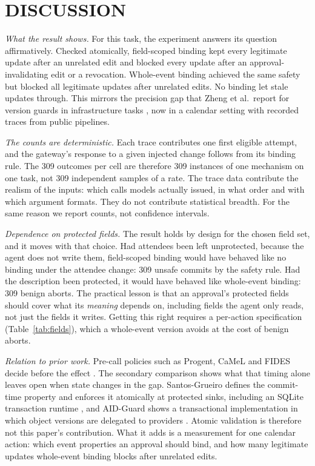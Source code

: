 \section{DISCUSSION}
\label{sec:discussion}
\textit{What the result shows.} For this task, the experiment answers its question affirmatively. Checked atomically, field-scoped binding kept every legitimate update after an unrelated edit and blocked every update after an approval-invalidating edit or a revocation. Whole-event binding achieved the same safety but blocked all legitimate updates after unrelated edits. No binding let stale updates through. This mirrors the precision gap that Zheng et al.\ report for version guards in infrastructure tasks \cite{zheng2026stale}, now in a calendar setting with recorded traces from public pipelines.

\textit{The counts are deterministic.} Each trace contributes one first eligible attempt, and the gateway's response to a given injected change follows from its binding rule. The 309 outcomes per cell are therefore 309 instances of one mechanism on one task, not 309 independent samples of a rate. The trace data contribute the realism of the inputs: which calls models actually issued, in what order and with which argument formats. They do not contribute statistical breadth. For the same reason we report counts, not confidence intervals.

\textit{Dependence on protected fields.} The result holds by design for the chosen field set, and it moves with that choice. Had attendees been left unprotected, because the agent does not write them, field-scoped binding would have behaved like no binding under the attendee change: 309 unsafe commits by the safety rule. Had the description been protected, it would have behaved like whole-event binding: 309 benign aborts. The practical lesson is that an approval's protected fields should cover what its \emph{meaning} depends on, including fields the agent only reads, not just the fields it writes. Getting this right requires a per-action specification (Table~\ref{tab:fields}), which a whole-event version avoids at the cost of benign aborts.

\textit{Relation to prior work.} Pre-call policies such as Progent, CaMeL and FIDES decide before the effect \cite{progent2025,camel2025,fides2025}. The secondary comparison shows what that timing alone leaves open when state changes in the gap. Santos-Grueiro defines the commit-time property and enforces it atomically at protected sinks, including an SQLite transaction runtime \cite{santosgrueiro2026}, and AID-Guard shows a transactional implementation in which object versions are delegated to providers \cite{aidguard2026}. Atomic validation is therefore not this paper's contribution. What it adds is a measurement for one calendar action: which event properties an approval should bind, and how many legitimate updates whole-event binding blocks after unrelated edits.

